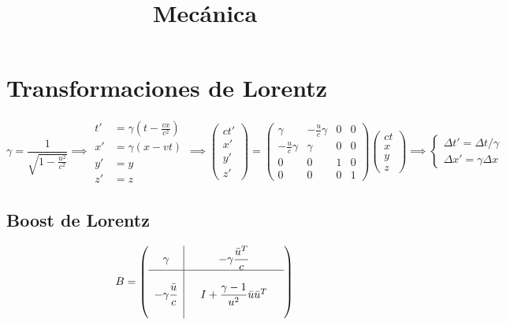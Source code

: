 \documentclass[leqno]{article}
\title{Mecánica}
\newcommand{\1}{\tikz[baseline=(char.base)]{
            \node[shape=circle,draw,inner sep=1pt] (char) {1};}}
\newcommand{\2}{\tikz[baseline=(char.base)]{
            \node[shape=circle,draw,inner sep=1pt] (char) {2};}}
\newcommand{\g}{\gamma}
\begin{document}
\maketitle
\tableofcontents
\newpage

\section{Transformaciones de Lorentz}
$$ \gamma = \dfrac{1}{\sqrt{1-\frac{u^2}{c^2}}} \implies 
\begin{aligned}t'&=\gamma \left(t-{\frac {vx}{c^{2}}}\right)\\x'&=\gamma \left(x-vt\right)\\y'&=y\\z'&=z\end{aligned} \implies 
\begin{pmatrix} ct' \\ x' \\ y' \\ z' \end{pmatrix} =
\begin{pmatrix}
\gamma & -\frac{u}{c}\gamma & 0 & 0 \\
-\frac{u}{c}\gamma & \gamma & 0 & 0 \\
                0 & 0 & 1 & 0 \\
                0 & 0 & 0 & 1  \end{pmatrix}\begin{pmatrix} ct \\ x \\ y \\ z \end{pmatrix}
\implies \begin{cases}
\Delta t' = \Delta t/\gamma  \\
\Delta x' =\gamma \Delta x
\end{cases}
$$

\subsection{Boost de Lorentz}
$$
B = \left(\begin{array}{c|ccc}
    \g &  & -\g\dfrac{\Bar{u}^T}{c} &   \\
    \hline
     &  &  &  \\
     -\g\dfrac{\Bar{u}}{c} &  & I+\dfrac{\g-1}{u^2}\Bar{u}\Bar{u}^T &    \\
     &  &  & 
\end{array}\right)
$$
\end{document}
